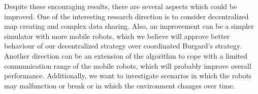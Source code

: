\documentclass[letterpaper, 10 pt, conference]{ieeeconf}  %
\begin{document}
Despite these encouraging results, there are several aspects which could be improved. One of the interesting research direction is to consider decentralized map creating and complex data sharing. Also, an improvement can be a simpler simulator with more mobile robots, which we believe will approve better behaviour of our decentralized strategy over coordinated Burgard's strategy. Another direction can be an extension of the algorithm to cope with a limited communication range of the mobile robots, which will probably improve overall performance. Additionally, we want to investigate scenarios in which the robots may malfunction or break or in which the environment changes over time.

\addtolength{\textheight}{-12cm}   %
\nocite{*}


\end{document}
